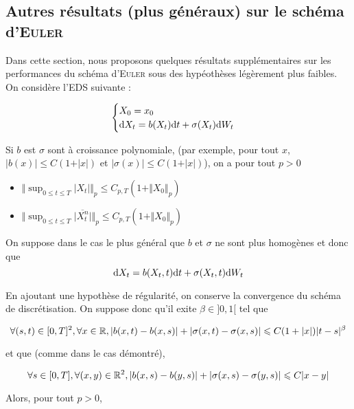 \subsection{Autres résultats (plus généraux) sur le schéma d'\textsc{Euler}}

Dans cette section, nous proposons quelques résultats supplémentaires sur les performances du schéma d'\textsc{Euler} sous des hypéothèses légèrement plus faibles.
On considère l'EDS suivante :

\begin{equation*}
    \begin{cases}
      X_0 = x_0 \\
      \mathrm{d} X_t = b(X_t) \mathrm{d} t + \sigma(X_t) \mathrm{d} W_t
    \end{cases}
\end{equation*}

\newcommand{\xt}{X_t}
\renewcommand{\supt}{\sup_{0 \leq t \leq T}}
\begin{prop}
  Si $b$ est $\sigma$ sont à croissance polynomiale, (par exemple, pour tout $x$, $\vert b(x) \vert \leq C(1 + \vert x \vert)$ et $\vert \sigma(x) \vert \leq C(1 + \vert x \vert)$), on a pour tout $p > 0$ 
  \begin{itemize}
    \item $\Vert \supt \vert \xt \vert \Vert_p \leq C_{p,T} (1 + \Vert X_0 \Vert_p)$
    \item $\Vert \supt \vert \overline{\xt^n} \vert \Vert_p \leq C_{p,T} (1 + \Vert X_0 \Vert_p)$
  \end{itemize}
\end{prop}

On suppose dans le cas le plus général que $b$ et $\sigma$ ne sont plus homogènes et donc que 
\newcommand{\wt}{W_t}
\[ \der \xt = b(\xt,t) \der t + \sigma(\xt,t) \der \wt \]

En ajoutant une hypothèse de régularité, on conserve la convergence du schéma de discrétisation. On suppose donc qu'il exite $\beta \in ]0,1[$ tel que 

\[ \forall (s,t) \in [0,T]^2, \forall x \in \mathbb{R}, \vert b(x,t) - b(x,s) \vert + \vert \sigma(x,t) - \sigma(x,s) \vert \leqslant C(1+\vert x \vert) \vert t -s \vert^\beta \]

et que (comme dans le cas démontré),

\[ \forall s \in [0,T], \forall (x,y) \in \mathbb{R}^2, \vert b(x,s) - b(y,s) \vert + \vert \sigma(x,s) - \sigma(y,s) \vert \leqslant C \vert x - y \vert  \]

Alors, pour tout $p > 0$,

